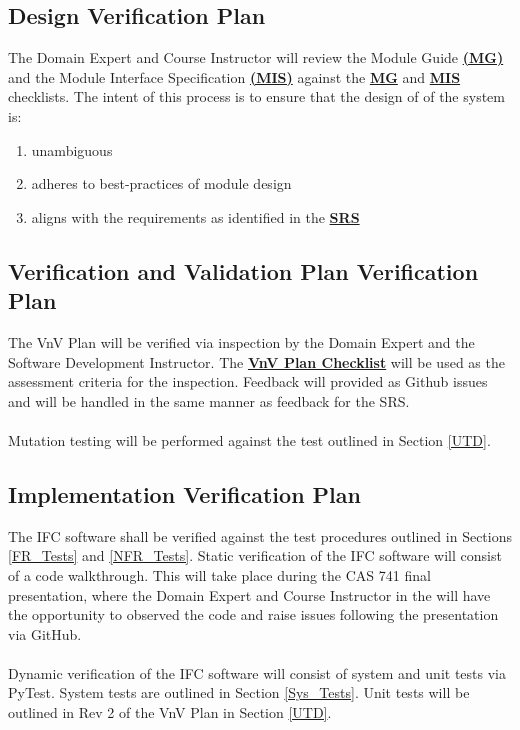 \documentclass[12pt, titlepage]{article}
\begin{document}
\subsection{Design Verification Plan}
The Domain Expert and Course Instructor will review the Module Guide 
\textbf{\href{https://github.com/KiranSingh15/CAS-741-Image-Correspondences/blob/main/docs/Design/SoftArchitecture/MG.pdf}
{(MG)}} and the Module Interface Specification 
\textbf{\href{https://github.com/KiranSingh15/CAS-741-Image-Correspondences/blob/main/docs/Design/SoftDetailedDes/MIS.pdf}
{(MIS)}} against the 
\textbf{\href{https://github.com/KiranSingh15/CAS-741-Image-Correspondences/blob/main/docs/Checklists/MG-Checklist.pdf}
{MG}} and
\textbf{\href{https://github.com/KiranSingh15/CAS-741-Image-Correspondences/blob/main/docs/Checklists/MIS-Checklist.pdf}
{MIS}} checklists. The intent of this process is to ensure that the design of of the system is:
\begin{enumerate}
\item unambiguous
\item adheres to best-practices of module design
\item aligns with the requirements as identified in the 
\textbf{\href{https://github.com/KiranSingh15/CAS-741-Image-Correspondences/blob/main/docs/SRS/SRS.pdf}
{SRS}}
\end{enumerate}


\subsection{Verification and Validation Plan Verification Plan}
The VnV Plan will be verified via inspection by the Domain Expert and the 
Software Development Instructor. The 
\textbf{\href{https://github.com/KiranSingh15/CAS-741-Image-Correspondences/blob/main/docs/Checklists/SRS-Checklist.pdf}
{VnV Plan Checklist}} 
will be used as the assessment criteria for the inspection. 
Feedback will provided as Github issues and will be handled in the same manner as feedback 
for the SRS.\\ \\
Mutation testing will be performed against the test outlined in Section \ref{UTD}.

\subsection{Implementation Verification Plan}
The IFC software shall be verified against the test procedures outlined in Sections \ref{FR_Tests} and 
\ref{NFR_Tests}. Static verification of the IFC software will consist of a code walkthrough. This will take 
place during the CAS 741 final presentation, where the Domain Expert and Course Instructor in the 
will have the opportunity to observed the code and raise issues following the presentation via GitHub. \\ \\
Dynamic  verification of the IFC software will consist of system and unit tests via PyTest. System tests 
are outlined in Section \ref{Sys_Tests}. Unit tests will be outlined in Rev 2 of the VnV Plan in 
Section \ref{UTD}.
\end{document}
